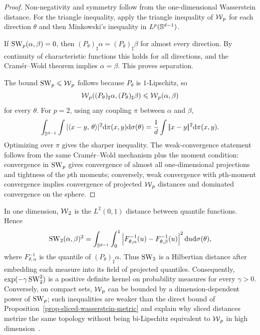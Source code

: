 \begin{proof}
	Non-negativity and symmetry follow from the one-dimensional Wasserstein distance. For the triangle inequality, apply the triangle inequality of $\operatorname{\mathcal{W}}_p$ for each direction $\theta$ and then Minkowski's inequality in $L^p(\mathbb{S}^{d-1})$.

	If $\operatorname{SW}_p(\alpha,\beta)=0$, then $(P_\theta)_\sharp\alpha=(P_\theta)_\sharp\beta$ for almost every direction. By continuity of characteristic functions this holds for all directions, and the Cram\'er--Wold theorem implies $\alpha=\beta$. This proves separation.

	The bound $\operatorname{SW}_p\leqslant\operatorname{\mathcal{W}}_p$ follows because $P_\theta$ is $1$-Lipschitz, so
	\[
		\operatorname{\mathcal{W}}_p((P_\theta)_\sharp\alpha,(P_\theta)_\sharp\beta)
		\leqslant
		\operatorname{\mathcal{W}}_p(\alpha,\beta)
	\]
	for every $\theta$. For $p=2$, using any coupling $\pi$ between $\alpha$ and $\beta$,
	\[
		\int_{\mathbb{S}^{d-1}}\int |\langle x-y,\,\theta\rangle|^2\mathrm{d}\pi(x,y)\mathrm{d}\sigma(\theta)
		=
		\frac1d\int|\!| x-y |\!|^2\mathrm{d}\pi(x,y).
	\]
	Optimizing over $\pi$ gives the sharper inequality. The weak-convergence statement follows from the same Cram\'er--Wold mechanism plus the moment condition: convergence in $\operatorname{SW}_p$ gives convergence of almost all one-dimensional projections and tightness of the $p$th moments; conversely, weak convergence with $p$th-moment convergence implies convergence of projected $\operatorname{\mathcal{W}}_p$ distances and dominated convergence on the sphere.
\end{proof}

\begin{rem}\label{rem-sliced-hilbert-embedding}
	In one dimension, $\operatorname{\mathcal{W}}_2$ is the $L^2(0,1)$ distance between quantile functions. Hence
	\[
		\operatorname{SW}_2(\alpha,\beta)^2
		=
		\int_{\mathbb{S}^{d-1}}\int_0^1
		\left\lvert F_{\theta,\alpha}^{-1}(u)-F_{\theta,\beta}^{-1}(u)\right\rvert^2
		\mathrm{d} u\mathrm{d}\sigma(\theta),
	\]
	where $F_{\theta,\alpha}^{-1}$ is the quantile of $(P_\theta)_\sharp\alpha$. Thus $\operatorname{SW}_2$ is a Hilbertian distance after embedding each measure into its field of projected quantiles. Consequently, $\exp(-\gamma\operatorname{SW}_2^2)$ is a positive definite kernel on probability measures for every $\gamma>0$.
	Conversely, on compact sets, $\operatorname{\mathcal{W}}_p$ can be bounded by a dimension-dependent power of $\operatorname{SW}_p$; such inequalities are weaker than the direct bound of Proposition~\ref{prop-sliced-wasserstein-metric} and explain why sliced distances metrize the same topology without being bi-Lipschitz equivalent to $\operatorname{\mathcal{W}}_p$ in high dimension~\cite{bonnotte2013unidimensional,nadjahi2019asymptotic}.
\end{rem}

